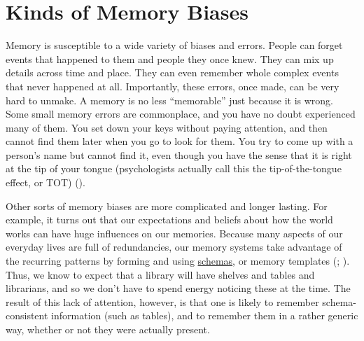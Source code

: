 \documentclass[
]{krantz}
\begin{document}
\section{Kinds of Memory Biases}\label{kinds-of-memory-biases}

Memory is susceptible to a wide variety of biases and errors. People can forget events that happened to them and people they once knew. They can mix up details across time and place. They can even remember whole complex events that never happened at all. Importantly, these errors, once made, can be very hard to unmake. A memory is no less ``memorable'' just
because it is wrong. Some small memory errors are commonplace, and you have no doubt
experienced many of them. You set down your keys without paying attention, and then cannot find them later when you go to look for them. You try to come up with a person's name but cannot find it, even though you have the sense that it is right at the tip of your tongue (psychologists actually call this the tip-of-the-tongue effect, or TOT) ().

Other sorts of memory biases are more complicated and longer lasting. For example, it turns out that our expectations and beliefs about how the world works can have huge influences on our memories. Because many aspects of our everyday lives are full of redundancies, our memory systems take advantage of the recurring patterns by forming and using \hyperref[schema]{schemas}, or memory templates (; ). Thus, we know to expect that a library will have shelves and tables and librarians, and so we don't have to spend energy noticing these at the time. The result of this lack of attention, however, is that one is likely to remember schema-consistent information (such as tables), and to remember them in a rather generic way, whether or not they were actually present.
\end{document}
